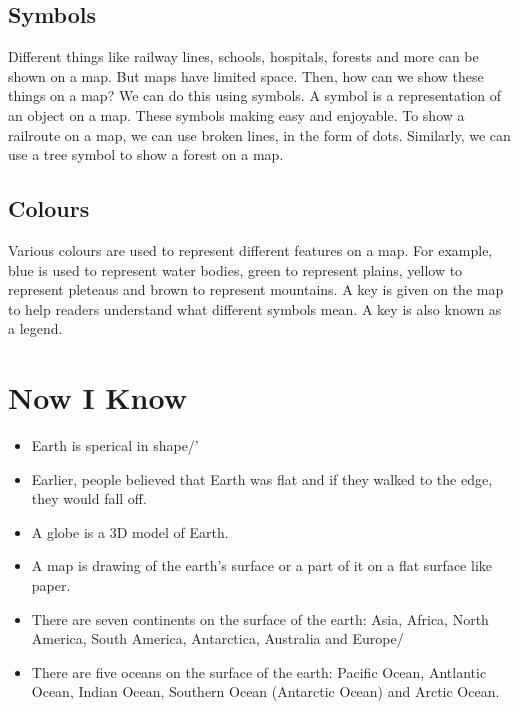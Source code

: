 \subsection{\textbf{Symbols}}
Different things like railway lines, schools, hospitals, forests and more can be shown on a map. But maps have limited space. Then, how can we show these things on a map? We can do this using symbols. A symbol is a representation of an object on a map. These symbols making easy and enjoyable. To show a railroute on a map, we can use broken lines, in the form of dots. Similarly, we can use a tree symbol to show a forest on a map.
\subsection{\textbf{Colours}}
Various colours are used to represent different features on a map. For example, blue is used to represent water bodies, green to represent plains, yellow to represent pleteaus and brown to represent mountains. A key is given on the map to help readers understand what different symbols mean. A key is also known as a legend.
\section{Now I Know}
\begin{itemize}
    \item Earth is sperical in shape/'
    \item Earlier, people believed that Earth was flat and if they walked to the edge, they would fall off.
    \item A globe is a 3D model of Earth.
    \item A map is drawing of the earth's surface or a part of it on a flat surface like paper.
    \item There are seven continents on the surface of the earth: Asia, Africa, North America, South America, Antarctica, Australia and Europe/
    \item There are five oceans on the surface of the earth: Pacific Ocean, Antlantic Ocean, Indian Ocean, Southern Ocean (Antarctic Ocean) and Arctic Ocean.
\end{itemize}